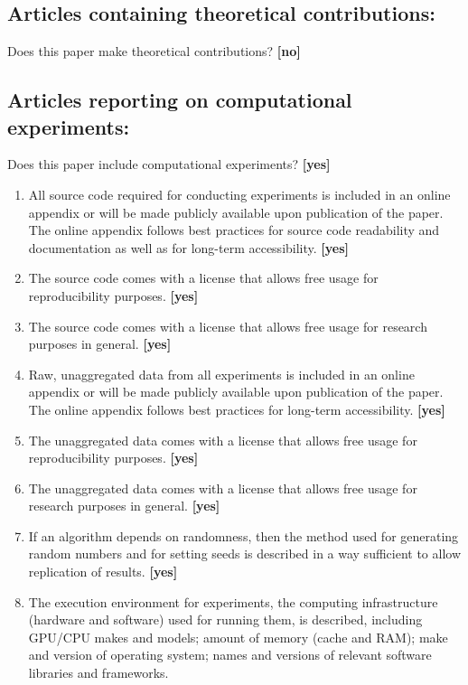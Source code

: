\documentclass[manuscript, screen, review]{jair}
\begin{document}
\subsection*{Articles containing theoretical contributions:}
Does this paper make theoretical contributions?
\textbf{[no]}

\subsection*{Articles reporting on computational experiments:}
Does this paper include computational experiments? \textbf{[yes]}

\begin{enumerate}
    \item All source code required for conducting experiments is included in an online appendix or will be made publicly available upon publication of the paper. The online appendix follows best practices for source code readability and documentation as well as for long-term accessibility.
    \textbf{[yes]}
    \item The source code comes with a license that allows free usage for reproducibility purposes.
    \textbf{[yes]}
    \item The source code comes with a license that allows free usage for research purposes in general.
    \textbf{[yes]}
    \item Raw, unaggregated data from all experiments is included in an online appendix or will be made publicly available upon publication of the paper. The online appendix follows best practices for long-term accessibility.
    \textbf{[yes]}
    \item The unaggregated data comes with a license that allows free usage for reproducibility purposes.
    \textbf{[yes]}
    \item The unaggregated data comes with a license that allows free usage for research purposes in general.
    \textbf{[yes]}
    \item If an algorithm depends on randomness, then the method used for generating random numbers and for setting seeds is described in a way sufficient to allow replication of results.
    \textbf{[yes]}
    \item The execution environment for experiments, the computing infrastructure (hardware and software) used for running them, is described, including GPU/CPU makes and models; amount of memory (cache and RAM); make and version of operating system; names and versions of relevant software libraries and frameworks.

\end{enumerate}
\end{document}
